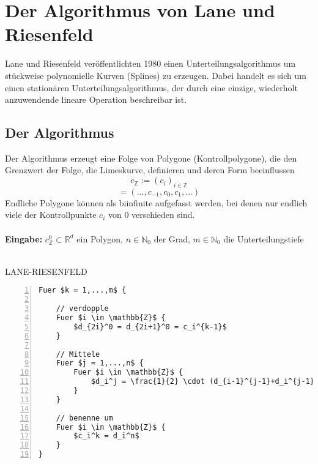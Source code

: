 \section{Der Algorithmus von Lane und Riesenfeld}
Lane und Riesenfeld veröffentlichten 1980 einen Unterteilungsalgorithmus um stückweise polynomielle Kurven (Splines) zu erzeugen. Dabei handelt es sich um einen stationären Unterteilungsalgorithmus, der durch eine einzige, wiederholt anzuwendende lineare Operation beschreibar ist.

\subsection{Der Algorithmus}
Der Algorithmus erzeugt eine Folge von Polygone (Kontrollpolygone), die den Grenzwert der Folge, die Limeskurve, definieren und deren Form beeinflussen
\[c_{\mathbb{Z}} := (c_i)_{i \in \mathbb{Z}}\]
\[= (...,c_{-1},c_0,c_1,...)\]
Endliche Polygone können als biinfinite aufgefasst werden, bei denen nur endlich viele der Kontrollpunkte \(c_i\) von \(0\) verschieden sind.
\\\\
\textbf{Eingabe:} \(c_{\mathbb{Z}}^0 \subset \mathbb{R}^d\) ein Polygon, \(n \in \mathbb{N}_0\) der Grad, \(m \in \mathbb{N}_0\) die Unterteilungstiefe
\\\\
\begin{minipage}{\textwidth}
LANE-RIESENFELD
\begin{lstlisting}[frame=single,numbers=left,mathescape]
Fuer $k = 1,...,m$ {

	// verdopple
	Fuer $i \in \mathbb{Z}$ {
		$d_{2i}^0 = d_{2i+1}^0 = c_i^{k-1}$
	}

	// Mittele
	Fuer $j = 1,...,n$ {
		Fuer $i \in \mathbb{Z}$ {
			$d_i^j = \frac{1}{2} \cdot (d_{i-1}^{j-1}+d_i^{j-1})$ 
		}
	}

	// benenne um
	Fuer $i \in \mathbb{Z}$ {
		$c_i^k = d_i^n$
	}
}
\end{lstlisting}
\end{minipage}


